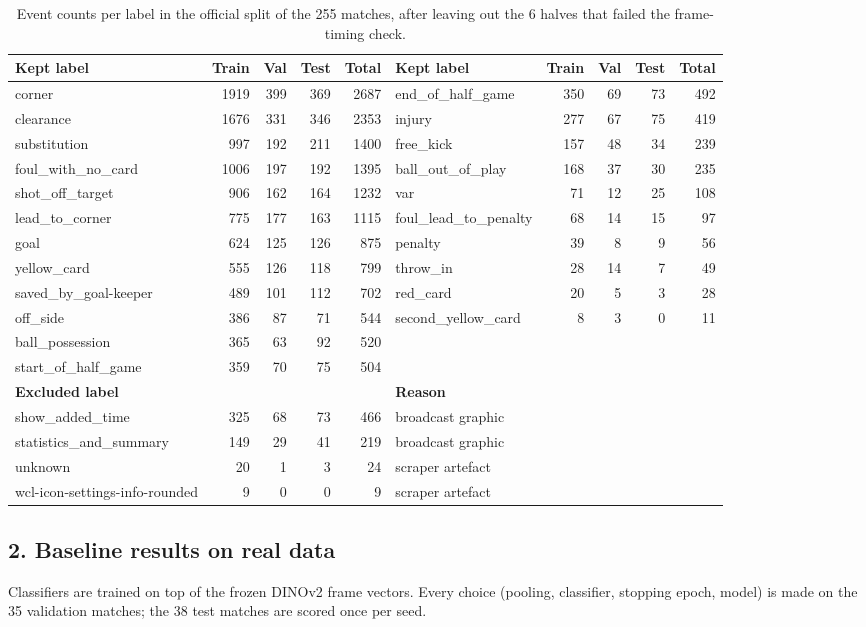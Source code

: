 \documentclass[11pt]{article}
\begin{document}
\begin{table}[h]
\centering\footnotesize
\begin{tabular}{lrrrr@{\hspace{2.5em}}lrrrr}
\toprule
Kept label & Train & Val & Test & Total & Kept label & Train & Val & Test & Total\\
\midrule
corner & 1919 & 399 & 369 & 2687 & end\_of\_half\_game & 350 & 69 & 73 & 492\\
clearance & 1676 & 331 & 346 & 2353 & injury & 277 & 67 & 75 & 419\\
substitution & 997 & 192 & 211 & 1400 & free\_kick & 157 & 48 & 34 & 239\\
foul\_with\_no\_card & 1006 & 197 & 192 & 1395 & ball\_out\_of\_play & 168 & 37 & 30 & 235\\
shot\_off\_target & 906 & 162 & 164 & 1232 & var & 71 & 12 & 25 & 108\\
lead\_to\_corner & 775 & 177 & 163 & 1115 & foul\_lead\_to\_penalty & 68 & 14 & 15 & 97\\
goal & 624 & 125 & 126 & 875 & penalty & 39 & 8 & 9 & 56\\
yellow\_card & 555 & 126 & 118 & 799 & throw\_in & 28 & 14 & 7 & 49\\
saved\_by\_goal-keeper & 489 & 101 & 112 & 702 & red\_card & 20 & 5 & 3 & 28\\
off\_side & 386 & 87 & 71 & 544 & second\_yellow\_card & 8 & 3 & 0 & 11\\
ball\_possession & 365 & 63 & 92 & 520 & & & & & \\
start\_of\_half\_game & 359 & 70 & 75 & 504 & & & & & \\
\midrule
\textbf{Excluded label} & & & & & \textbf{Reason} & & & & \\
show\_added\_time & 325 & 68 & 73 & 466 & broadcast graphic & & & & \\
statistics\_and\_summary & 149 & 29 & 41 & 219 & broadcast graphic & & & & \\
unknown & 20 & 1 & 3 & 24 & scraper artefact & & & & \\
wcl-icon-settings-info-rounded & 9 & 0 & 0 & 9 & scraper artefact & & & & \\
\bottomrule
\end{tabular}
\caption{Event counts per label in the official split of the 255 matches, after leaving out the 6 halves that
failed the frame-timing check.}
\label{tab:labels}
\end{table}

\subsection*{2. Baseline results on real data}
Classifiers are trained on top of the frozen DINOv2 frame vectors. Every choice (pooling, classifier,
stopping epoch, model) is made on the 35 validation matches; the 38 test matches are scored once per seed.
\end{document}
